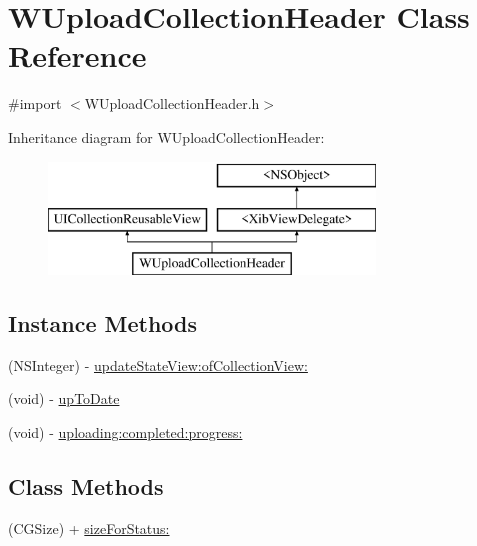 \hypertarget{interface_w_upload_collection_header}{\section{W\-Upload\-Collection\-Header Class Reference}
\label{interface_w_upload_collection_header}
}


{\ttfamily \#import $<$W\-Upload\-Collection\-Header.\-h$>$}

Inheritance diagram for W\-Upload\-Collection\-Header\-:\begin{figure}[H]
\begin{center}
\leavevmode
\includegraphics[height=3.000000cm]{interface_w_upload_collection_header}
\end{center}
\end{figure}
\subsection*{Instance Methods}
\begin{DoxyCompactItemize}
\item 
(N\-S\-Integer) -\/ \hyperlink{interface_w_upload_collection_header_a0929ed8311b67da1499c46be600b117e}{update\-State\-View\-:of\-Collection\-View\-:}
\item 
(void) -\/ \hyperlink{interface_w_upload_collection_header_a0b46ffbf01d8b207f3fd8ba567a7263d}{up\-To\-Date}
\item 
(void) -\/ \hyperlink{interface_w_upload_collection_header_a43ba58169ab1e976eea294a237e75b45}{uploading\-:completed\-:progress\-:}
\end{DoxyCompactItemize}
\subsection*{Class Methods}
\begin{DoxyCompactItemize}
\item 
(C\-G\-Size) + \hyperlink{interface_w_upload_collection_header_aa056912a570970f6ba5e4fc8dbc46db2}{size\-For\-Status\-:}
\end{DoxyCompactItemize}

